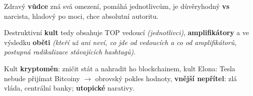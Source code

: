 Zdravý \textbf{vůdce} zná svá omezení, pomáhá jednotlivcům, je důvěryhodný \textbf{vs} narcista, hladový po moci, chce absolutní autoritu.

\vspace{4pt}
\noindent Destruktivní \textbf{kult} tedy obsahuje TOP vedoucí \textit{(jednotlivci)}, \textbf{amplifikátory} a ve výsledku \textbf{oběti} \textit{(kteří už ani neví, co jde od vedoucích a co od amplifikátorů, postupná radikalizace stávajících hashtagů)}.

\vspace{4pt}
\noindent Kult \textbf{kryptoměn}: zničit stát a nahradit ho blockchainem, kult Elona: Tesla nebude přijímat Bitcoiny $\to$ obrovský pokles hodnoty, \textbf{vnější nepřítel}: zlá vláda, centrální banky; \textbf{utopické} narativy.
